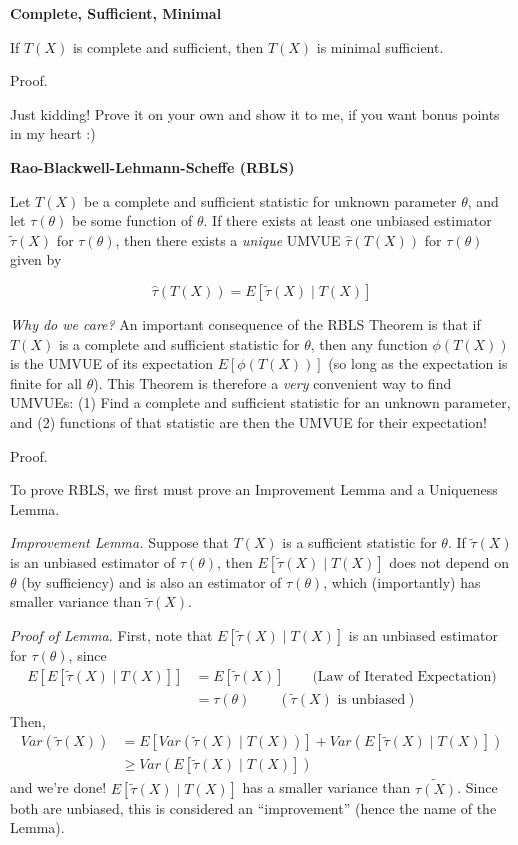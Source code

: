 \documentclass[
  letterpaper,
  DIV=11,
  numbers=noendperiod]{scrreprt}
\begin{document}
\textbf{Complete, Sufficient, Minimal}

If \(T(X)\) is complete and sufficient, then \(T(X)\) is minimal
sufficient.

Proof.

Just kidding! Prove it on your own and show it to me, if you want bonus
points in my heart :)

\textbf{Rao-Blackwell-Lehmann-Scheffe (RBLS)}

Let \(T(X)\) be a complete and sufficient statistic for unknown
parameter \(\theta\), and let \(\tau(\theta)\) be some function of
\(\theta\). If there exists at least one unbiased estimator
\(\tilde{\tau}(X)\) for \(\tau(\theta)\), then there exists a
\emph{unique} UMVUE \(\hat{\tau}(T(X))\) for \(\tau(\theta)\) given by

\[
\hat{\tau}(T(X)) = E[\tilde{\tau}(X) \mid T(X)]
\]

\emph{Why do we care?} An important consequence of the RBLS Theorem is
that if \(T(X)\) is a complete and sufficient statistic for \(\theta\),
then any function \(\phi(T(X))\) is the UMVUE of its expectation
\(E[\phi(T(X))]\) (so long as the expectation is finite for all
\(\theta\)). This Theorem is therefore a \emph{very} convenient way to
find UMVUEs: (1) Find a complete and sufficient statistic for an unknown
parameter, and (2) functions of that statistic are then the UMVUE for
their expectation!

Proof.

To prove RBLS, we first must prove an Improvement Lemma and a Uniqueness
Lemma.

\emph{Improvement Lemma.} Suppose that \(T(X)\) is a sufficient
statistic for \(\theta\). If \(\tilde{\tau}(X)\) is an unbiased
estimator of \(\tau(\theta)\), then \(E[\tilde{\tau}(X) \mid T(X)]\)
does not depend on \(\theta\) (by sufficiency) and is also an estimator
of \(\tau(\theta)\), which (importantly) has smaller variance than
\(\tilde{\tau}(X)\).

\emph{Proof of Lemma.} First, note that \(E[\tilde{\tau}(X) \mid T(X)]\)
is an unbiased estimator for \(\tau(\theta)\), since \begin{align*}
    E[E[\tilde{\tau}(X) \mid T(X)]] & = E[\tilde{\tau}(X)] \quad \quad \text{(Law of Iterated Expectation)} \\
    & = \tau(\theta) \quad \quad (\tilde{\tau}(X) \text{ is unbiased})
\end{align*} Then, \begin{align*}
    Var(\tilde{\tau}(X)) & = E[Var(\tilde{\tau}(X) \mid T(X))] + Var(E[\tilde{\tau}(X) \mid T(X)]) \\
    & \geq Var(E[\tilde{\tau}(X) \mid T(X)])
\end{align*} and we're done! \(E[\tilde{\tau}(X) \mid T(X)]\) has a
smaller variance than \(\tilde{\tau(X)}\). Since both are unbiased, this
is considered an ``improvement'' (hence the name of the Lemma).
\end{document}
